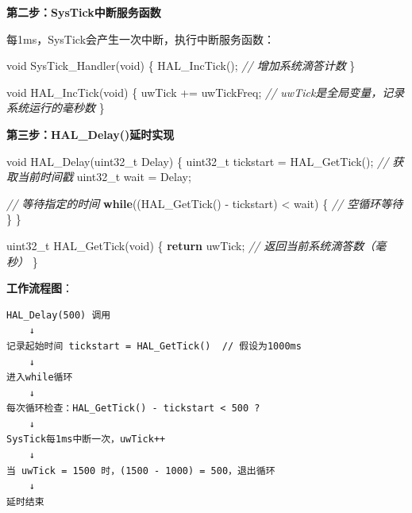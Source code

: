 \documentclass[
  chinese,
  UTF8,
  oneside,
  openany]{ctexbook}
\newenvironment{Shaded}{}{}
\newcommand{\CommentTok}[1]{\textcolor[rgb]{0.38,0.63,0.69}{\textit{#1}}}
\newcommand{\ControlFlowTok}[1]{\textcolor[rgb]{0.00,0.44,0.13}{\textbf{#1}}}
\newcommand{\DataTypeTok}[1]{\textcolor[rgb]{0.56,0.13,0.00}{#1}}
\newcommand{\NormalTok}[1]{#1}
\newcommand{\OperatorTok}[1]{\textcolor[rgb]{0.40,0.40,0.40}{#1}}
\begin{document}
\textbf{第二步：SysTick中断服务函数}

每1ms，SysTick会产生一次中断，执行中断服务函数：

\begin{Shaded}
\begin{Highlighting}[]
\DataTypeTok{void}\NormalTok{ SysTick\_Handler}\OperatorTok{(}\DataTypeTok{void}\OperatorTok{)}
\OperatorTok{\{}
\NormalTok{  HAL\_IncTick}\OperatorTok{();}  \CommentTok{// 增加系统滴答计数}
\OperatorTok{\}}

\DataTypeTok{void}\NormalTok{ HAL\_IncTick}\OperatorTok{(}\DataTypeTok{void}\OperatorTok{)}
\OperatorTok{\{}
\NormalTok{  uwTick }\OperatorTok{+=}\NormalTok{ uwTickFreq}\OperatorTok{;}  \CommentTok{// uwTick是全局变量，记录系统运行的毫秒数}
\OperatorTok{\}}
\end{Highlighting}
\end{Shaded}

\textbf{第三步：HAL\_Delay()延时实现}

\begin{Shaded}
\begin{Highlighting}[]
\DataTypeTok{void}\NormalTok{ HAL\_Delay}\OperatorTok{(}\DataTypeTok{uint32\_t}\NormalTok{ Delay}\OperatorTok{)}
\OperatorTok{\{}
  \DataTypeTok{uint32\_t}\NormalTok{ tickstart }\OperatorTok{=}\NormalTok{ HAL\_GetTick}\OperatorTok{();}  \CommentTok{// 获取当前时间戳}
  \DataTypeTok{uint32\_t}\NormalTok{ wait }\OperatorTok{=}\NormalTok{ Delay}\OperatorTok{;}

  \CommentTok{// 等待指定的时间}
  \ControlFlowTok{while}\OperatorTok{((}\NormalTok{HAL\_GetTick}\OperatorTok{()} \OperatorTok{{-}}\NormalTok{ tickstart}\OperatorTok{)} \OperatorTok{\textless{}}\NormalTok{ wait}\OperatorTok{)}
  \OperatorTok{\{}
    \CommentTok{// 空循环等待}
  \OperatorTok{\}}
\OperatorTok{\}}

\DataTypeTok{uint32\_t}\NormalTok{ HAL\_GetTick}\OperatorTok{(}\DataTypeTok{void}\OperatorTok{)}
\OperatorTok{\{}
  \ControlFlowTok{return}\NormalTok{ uwTick}\OperatorTok{;}  \CommentTok{// 返回当前系统滴答数（毫秒）}
\OperatorTok{\}}
\end{Highlighting}
\end{Shaded}

\textbf{工作流程图}：

\begin{verbatim}
HAL_Delay(500) 调用
    ↓
记录起始时间 tickstart = HAL_GetTick()  // 假设为1000ms
    ↓
进入while循环
    ↓
每次循环检查：HAL_GetTick() - tickstart < 500 ?
    ↓
SysTick每1ms中断一次，uwTick++
    ↓
当 uwTick = 1500 时，(1500 - 1000) = 500，退出循环
    ↓
延时结束
\end{verbatim}
\end{document}
